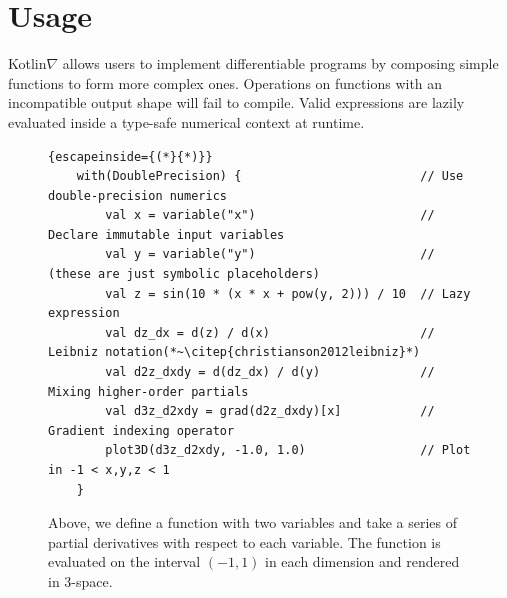 \documentclass{article}
\begin{document}
\section{Usage}

Kotlin$\nabla$ allows users to implement differentiable programs by composing simple functions to form more complex ones. Operations on functions with an incompatible output shape will fail to compile. Valid expressions are lazily evaluated inside a type-safe numerical context at runtime.

\begin{figure}[!htb]
    \begin{lstlisting}{escapeinside={(*}{*)}}
    with(DoublePrecision) {                         // Use double-precision numerics
        val x = variable("x")                       // Declare immutable input variables
        val y = variable("y")                       // (these are just symbolic placeholders)
        val z = sin(10 * (x * x + pow(y, 2))) / 10  // Lazy expression
        val dz_dx = d(z) / d(x)                     // Leibniz notation(*~\citep{christianson2012leibniz}*)
        val d2z_dxdy = d(dz_dx) / d(y)              // Mixing higher-order partials
        val d3z_d2xdy = grad(d2z_dxdy)[x]           // Gradient indexing operator
        plot3D(d3z_d2xdy, -1.0, 1.0)                // Plot in -1 < x,y,z < 1
    }
    \end{lstlisting}

    \caption{Above, we define a function with two variables and take a series of partial derivatives with respect to each variable. The function is evaluated on the interval $(-1, 1)$ in each dimension and rendered in 3-space.}
    \label{label:fig1}
\end{figure}
\end{document}

